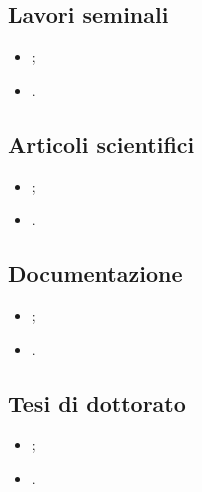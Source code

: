 \subsection*{Lavori seminali}
\begin{itemize}

\item \cite{};

\item \cite{}.

\end{itemize}

\subsection*{Articoli scientifici}
\begin{itemize}

\item \cite{};

\item \cite{}.

\end{itemize}

\subsection*{Documentazione}
\begin{itemize}

\item \cite{};

\item \cite{}.

\end{itemize}

\subsection*{Tesi di dottorato}
\begin{itemize}

\item \cite{};

\item \cite{}.

\end{itemize}